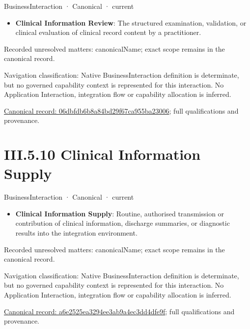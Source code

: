 \label{element:06dbfdb6b8a84bd29f67ca955ba23006}
{\small BusinessInteraction · Canonical · current}\par

\begin{itemize}


\item \textbf{Clinical Information Review}: The structured examination, validation, or clinical evaluation of clinical record content by a practitioner.

\end{itemize}

{\small Recorded unresolved matters: canonicalName; exact scope remains in the canonical record.}\par
{\small Navigation classification: Native BusinessInteraction definition is determinate, but no governed capability context is represented for this interaction. No Application Interaction, integration flow or capability allocation is inferred.}\par
{\footnotesize \href{../../../../continuum/business/business-interaction/06dbfdb6b8a84bd29f67ca955ba23006.md}{Canonical record: 06dbfdb6b8a84bd29f67ca955ba23006}; full qualifications and provenance.}\par
\section*{III.5.10 Clinical Information Supply}
\label{navigation:III.5.10}

\label{element:a6e2525ea3294ee3ab9a4ec3dd4dfe9f}
{\small BusinessInteraction · Canonical · current}\par

\begin{itemize}


\item \textbf{Clinical Information Supply}: Routine, authorised transmission or contribution of clinical information, discharge summaries, or diagnostic results into the integration environment.

\end{itemize}

{\small Recorded unresolved matters: canonicalName; exact scope remains in the canonical record.}\par
{\small Navigation classification: Native BusinessInteraction definition is determinate, but no governed capability context is represented for this interaction. No Application Interaction, integration flow or capability allocation is inferred.}\par
{\footnotesize \href{../../../../continuum/business/business-interaction/a6e2525ea3294ee3ab9a4ec3dd4dfe9f.md}{Canonical record: a6e2525ea3294ee3ab9a4ec3dd4dfe9f}; full qualifications and provenance.}\par
